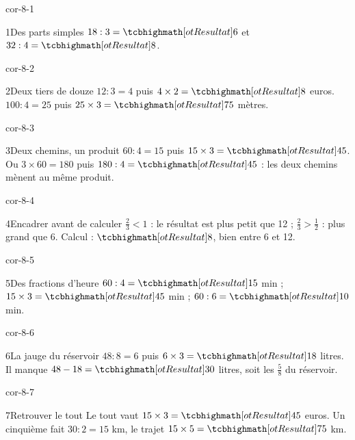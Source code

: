 \clearpage\pagestyle{otMain}\setlength{\otBlocEspacement}{2.5mm}\fontsize{11}{15}\selectfont{}
\begin{blocLivre}{cor-8-1}\begin{corrige}{1}{Des parts simples}
$18:3=\res6$ et $32:4=\res8$.
\end{corrige}\end{blocLivre}
\begin{blocLivre}{cor-8-2}\begin{corrige}{2}{Deux tiers de douze}
$12:3=4$ puis $4\times2=\res8$ euros. $100:4=25$ puis $25\times3=\res{75}$ mètres.
\end{corrige}\end{blocLivre}
\begin{blocLivre}{cor-8-3}\begin{corrige}{3}{Deux chemins, un produit}
$60:4=15$ puis $15\times3=\res{45}$. Ou $3\times60=180$ puis $180:4=\res{45}$ : les deux chemins mènent au même produit.
\end{corrige}\end{blocLivre}
\begin{blocLivre}{cor-8-4}\begin{corrige}{4}{Encadrer avant de calculer}
$\frac23<1$ : le résultat est plus petit que 12 ; $\frac23>\frac12$ : plus grand que 6. Calcul : $\res8$, bien entre 6 et 12.
\end{corrige}\end{blocLivre}
\begin{blocLivre}{cor-8-5}\begin{corrige}{5}{Des fractions d’heure}
$60:4=\res{15}$ min ; $15\times3=\res{45}$ min ; $60:6=\res{10}$ min.
\end{corrige}\end{blocLivre}
\begin{blocLivre}{cor-8-6}\begin{corrige}{6}{La jauge du réservoir}
$48:8=6$ puis $6\times3=\res{18}$ litres. Il manque $48-18=\res{30}$ litres, soit les $\frac58$ du réservoir.
\end{corrige}\end{blocLivre}
\begin{blocLivre}{cor-8-7}\begin{corrige}{7}{Retrouver le tout}
Le tout vaut $15\times3=\res{45}$ euros. Un cinquième fait $30:2=15$ km, le trajet $15\times5=\res{75}$ km.
\end{corrige}\end{blocLivre}
